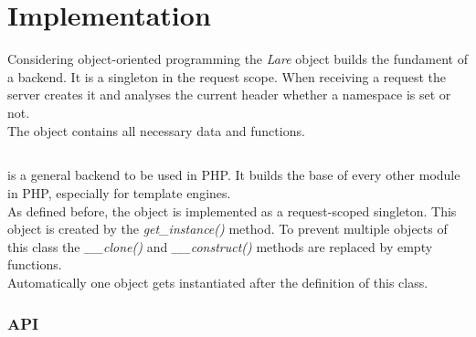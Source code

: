 \section{Implementation\label{chap:implementation}}

Considering object-oriented programming the \emph{Lare} object builds the fundament of a \lare{} backend.
It is a singleton in the request scope.
When receiving a request the server creates it and analyses the current \http{} header whether a namespace is set or not.
\\
The \lare{} object contains all necessary data and functions.


\subsection{\phpLare{}}
\phpLare{} is a general \lare{} backend to be used in PHP.
It builds the base of every other \lare{} module in PHP, especially for template engines.
\\
As defined before, the \lare{} object is implemented as a request-scoped singleton.
This object is created by the \emph{get\_instance()} method.
To prevent multiple objects of this class the \emph{\_\_clone()} and  \emph{\_\_construct()} methods are replaced by empty functions.
\\
Automatically one object gets instantiated after the definition of this class.


\subsubsection{API}

